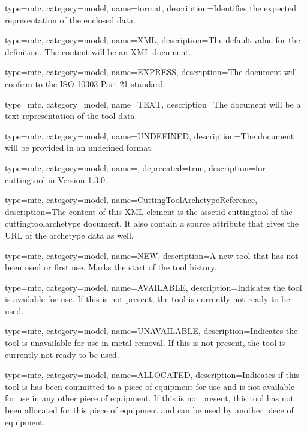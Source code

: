 {
  type=mtc,
  category=model,
  name={format},
  description={Identifies the expected representation of the enclosed data.}
}


{
  type=mtc,
  category=model,
  name={XML},
  description={The default value for the definition. The content will be an XML document.}
}


{
  type=mtc,
  category=model,
  name={EXPRESS},
  description={The document will confirm to the ISO 10303 Part 21 standard.}
}


{
  type=mtc,
  category=model,
  name={TEXT},
  description={The document will be a text representation of the tool data.}
}


{
  type=mtc,
  category=model,
  name={UNDEFINED},
  description={The document will be provided in an undefined format.}
}


{
  type=mtc,
  category=model,
  name=,
  deprecated={true},
  description={\DEPRECATED for \gls{cuttingtool} in Version 1.3.0.   \newline {}}
}


{
  type=mtc,
  category=model,
  name={CuttingToolArchetypeReference},
  description={The content of this XML element is the \gls{assetid cuttingtool} of the \gls{cuttingtoolarchetype} document. It \MAY also contain a source attribute that gives the URL of the archetype data as well.}
}


{
  type=mtc,
  category=model,
  name={NEW},
  description={A new tool that has not been used or first use. Marks the start of the tool history.}
}


{
  type=mtc,
  category=model,
  name={AVAILABLE},
  description={Indicates the tool is available for use. If this is not present, the tool is currently not ready to be used.}
}


{
  type=mtc,
  category=model,
  name={UNAVAILABLE},
  description={Indicates the tool is unavailable for use in metal removal. If this is not present, the tool is currently not ready to be used.}
}


{
  type=mtc,
  category=model,
  name={ALLOCATED},
  description={Indicates if this tool is has been committed to a piece of equipment for use and is not available for use in any other piece of equipment. If this is not present, this tool has not been allocated for this piece of equipment and can be used by another piece of equipment.}
}



